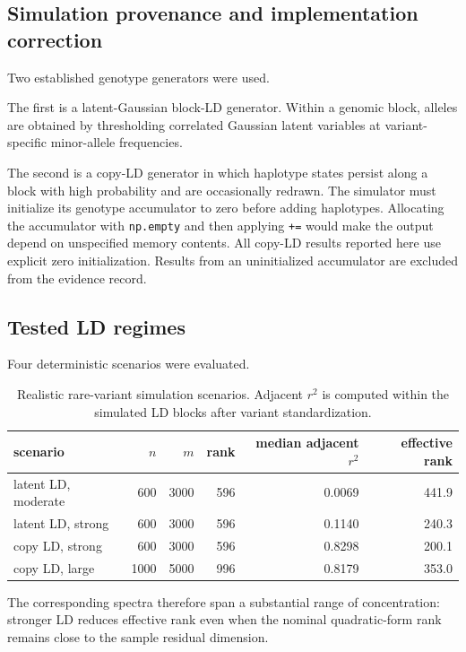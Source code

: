 \subsection{Simulation provenance and implementation correction}

Two established genotype generators were used.

The first is a latent-Gaussian block-LD generator.  Within a genomic block,
alleles are obtained by thresholding correlated Gaussian latent variables at
variant-specific minor-allele frequencies.

The second is a copy-LD generator in which haplotype states persist along a
block with high probability and are occasionally redrawn. The simulator
must initialize its genotype accumulator to zero before adding haplotypes.
Allocating the accumulator with \verb|np.empty| and then applying
\verb|+=| would make the output depend on unspecified memory contents.
All copy-LD results reported here use explicit zero initialization. Results
from an uninitialized accumulator are excluded from the evidence record.

\subsection{Tested LD regimes}

Four deterministic scenarios were evaluated.

\begin{table}[htbp]
\centering
\caption{Realistic rare-variant simulation scenarios.  Adjacent $r^2$ is
computed within the simulated LD blocks after variant standardization.}
\begin{tabular}{lrrrrr}
\toprule
scenario & $n$ & $m$ & rank & median adjacent $r^2$ & effective rank\\
\midrule
latent LD, moderate & 600 & 3000 & 596 & 0.0069 & 441.9\\
latent LD, strong & 600 & 3000 & 596 & 0.1140 & 240.3\\
copy LD, strong & 600 & 3000 & 596 & 0.8298 & 200.1\\
copy LD, large & 1000 & 5000 & 996 & 0.8179 & 353.0\\
\bottomrule
\end{tabular}
\end{table}

The corresponding spectra therefore span a substantial range of concentration:
stronger LD reduces effective rank even when the nominal quadratic-form rank
remains close to the sample residual dimension.

